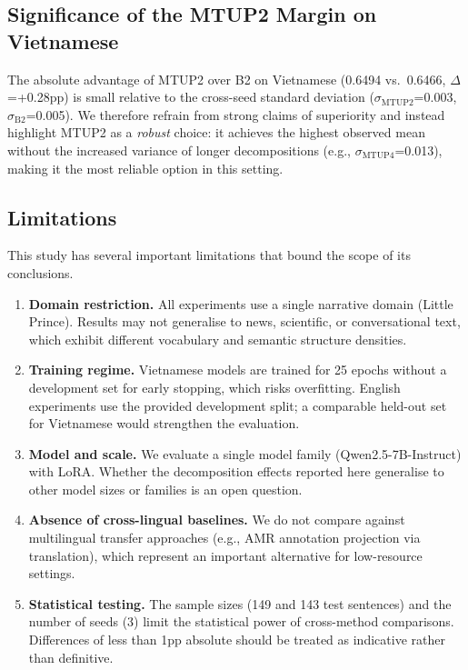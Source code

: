 \documentclass[11pt,a4paper]{article}
\begin{document}
\subsection{Significance of the MTUP2 Margin on Vietnamese}

The absolute advantage of MTUP2 over B2 on Vietnamese (0.6494 vs.\ 0.6466,
$\Delta$=+0.28pp) is small relative to the cross-seed standard deviation
($\sigma_{\text{MTUP2}}$=0.003, $\sigma_{\text{B2}}$=0.005). We therefore
refrain from strong claims of superiority and instead highlight MTUP2 as a
\emph{robust} choice: it achieves the highest observed mean without the
increased variance of longer decompositions (e.g., $\sigma_{\text{MTUP4}}$=0.013),
making it the most reliable option in this setting.

\subsection{Limitations}

This study has several important limitations that bound the scope of its
conclusions.

\begin{enumerate}
    \item \textbf{Domain restriction.} All experiments use a single narrative
          domain (Little Prince). Results may not generalise to news, scientific,
          or conversational text, which exhibit different vocabulary and semantic
          structure densities.

    \item \textbf{Training regime.} Vietnamese models are trained for 25 epochs
          without a development set for early stopping, which risks overfitting.
          English experiments use the provided development split; a comparable
          held-out set for Vietnamese would strengthen the evaluation.

    \item \textbf{Model and scale.} We evaluate a single model family
          (Qwen2.5-7B-Instruct) with LoRA. Whether the decomposition effects
          reported here generalise to other model sizes or families is an open
          question.

    \item \textbf{Absence of cross-lingual baselines.} We do not compare against
          multilingual transfer approaches (e.g., AMR annotation projection via
          translation), which represent an important alternative for low-resource
          settings.

    \item \textbf{Statistical testing.} The sample sizes (149 and 143 test
          sentences) and the number of seeds (3) limit the statistical power of
          cross-method comparisons. Differences of less than 1pp absolute should
          be treated as indicative rather than definitive.
\end{enumerate}
\end{document}

